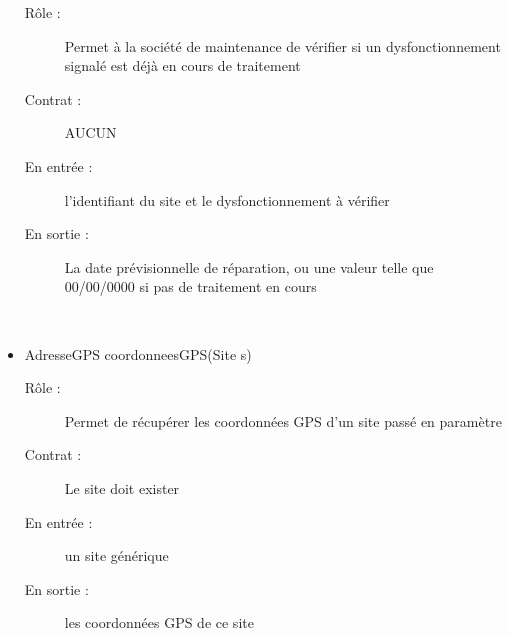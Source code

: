 \begin{itemize}
	\begin{description} 
		\item[Rôle :] Permet à la société de maintenance de vérifier si un dysfonctionnement signalé est déjà en cours de traitement
		\item[Contrat :] AUCUN
		\item[En entrée :] l'identifiant du site et le dysfonctionnement à vérifier
		\item[En sortie :] La date prévisionnelle de réparation, ou une valeur telle que 00/00/0000 si pas de traitement en cours
	\end{description}
	~\\
	\item AdresseGPS coordonneesGPS(Site s)
	\begin{description} 
		\item[Rôle :] Permet de récupérer les coordonnées GPS d'un site passé en paramètre
		\item[Contrat :] Le site doit exister
		\item[En entrée :] un site générique
		\item[En sortie :] les coordonnées GPS de ce site
	\end{description}
	~\\
\end{itemize}

